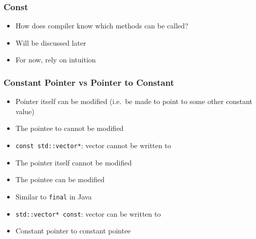 \documentclass{../ucll-slides}
\begin{document}
\begin{frame}
  \frametitle{Const}
  \begin{itemize}
    \item How does compiler know which methods can be called?
    \item Will be discussed later
    \item For now, rely on intuition
  \end{itemize}
\end{frame}

\begin{frame}
  \frametitle{Constant Pointer vs Pointer to Constant}
  \begin{itemize}
    \item Pointer itself can be modified (i.e.\ be made to point to some other constant value)
    \item The pointee to cannot be modified
    \item {\tt const std::vector*}: vector cannot be written to
  \end{itemize}
  \vskip2mm
  \begin{itemize}
    \item The pointer itself cannot be modified
    \item The pointee can be modified
    \item Similar to {\tt final} in Java
    \item {\tt std::vector* const}: vector can be written to
  \end{itemize}
  \vskip2mm
  \begin{itemize}
    \item Constant pointer to constant pointee
  \end{itemize}
\end{frame}
\end{document}
